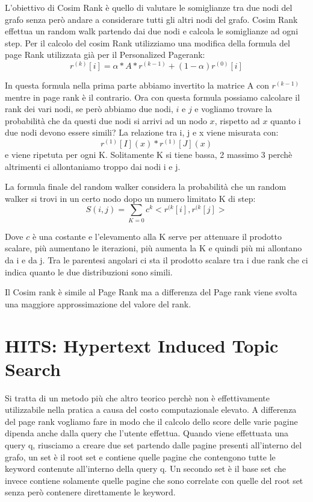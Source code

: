 \documentclass[14pt]{extreport}
\begin{document}
L'obiettivo di Cosim Rank è quello di valutare le somiglianze tra due nodi del grafo senza però andare a considerare tutti gli altri nodi del grafo.
Cosim Rank effettua un random walk partendo dai due nodi e calcola le somiglianze ad ogni step.
Per il calcolo del cosim Rank utilizziamo una modifica della formula del page Rank utilizzata già per il Personalized Pagerank:
\newline
\begin{equation}
    r^{(k)}[i] = \alpha * A * r^{(k-1)} + (1-\alpha) r^{(0)}[i]
\end{equation}

In questa formula nella prima parte abbiamo invertito la matrice A con $r^{(k-1)}$ mentre in page rank è il contrario. 
Ora con questa formula possiamo calcolare il rank dei vari nodi, se però abbiamo due nodi, $i$ e $j$ e vogliamo trovare la probabilità che da questi due nodi si arrivi ad un nodo $x$, rispetto ad $x$ quanto i due nodi devono essere simili?
La relazione tra i, j e x viene misurata con:
\newline
\begin{equation}
    r^{(1)}[I](x) * r^{(1)}[J](x)
\end{equation}
e viene ripetuta per ogni K. Solitamente K si tiene bassa, 2 massimo 3 perchè altrimenti ci allontaniamo troppo dai nodi i e j.

La formula finale del random walker considera la probabilità che un random walker si trovi in un certo nodo dopo un numero limitato K di step:
\newline
\begin{equation}
    S(i,j) = \sum \limits_{K = 0} c^k <r^{(k}[i],r^{(k}[j]>
\end{equation}

Dove $c$ è una costante e l'elevamento alla K serve per attenuare il prodotto scalare, più aumentano le iterazioni, più aumenta la K e quindi più mi allontano da i e da j. Tra le parentesi angolari ci sta il prodotto scalare tra i due rank che ci indica quanto le due distribuzioni sono simili.

Il Cosim rank è simile al Page Rank ma a differenza del Page rank viene svolta una maggiore approssimazione del valore del rank.

\section{HITS: Hypertext Induced Topic Search}

Si tratta di un metodo più che altro teorico perchè non è effettivamente utilizzabile nella pratica a causa del costo computazionale elevato.
A differenza del page rank vogliamo fare in modo che il calcolo dello score delle varie pagine dipenda anche dalla query che l'utente effettua.
Quando viene effettuata una query q, riusciamo a creare due set partendo dalle pagine presenti all'interno del grafo, un set è il root set e contiene quelle pagine che contengono tutte le keyword contenute all'interno della query q. Un secondo set è il base set che invece contiene solamente quelle pagine che sono correlate con quelle del root set senza però contenere direttamente le keyword.
\end{document}
